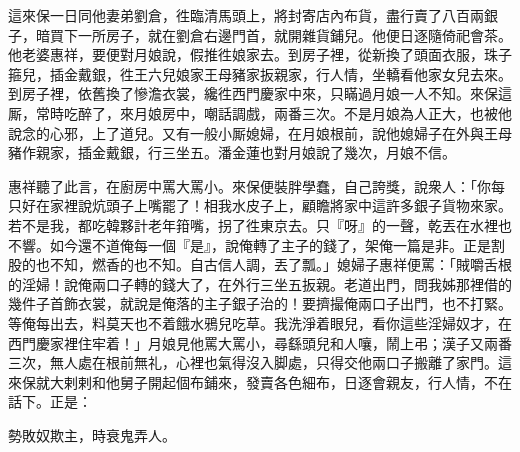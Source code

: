 這來保一日同他妻弟劉倉，徃臨清馬頭上，將封寄店內布貨，盡行賣了八百兩銀子，暗買下一所房子，就在劉倉右邊門首，就開雜貨鋪兒。他便日逐隨倚祀會茶。他老婆惠祥，要便對月娘說，假推徃娘家去。到房子裡，從新換了頭面衣服，珠子箍兒，插金戴銀，徃王六兒娘家王母豬家扳親家，行人情，坐轎看他家女兒去來。到房子裡，依舊換了慘澹衣裳，纔徃西門慶家中來，只瞞過月娘一人不知。來保這厮，常時吃醉了，來月娘房中，嘲話調戲，兩番三次。不是月娘為人正大，也被他說念的心邪，上了道兒。又有一般小厮媳婦，在月娘根前，說他媳婦子在外與王母豬作親家，插金戴銀，行三坐五。潘金蓮也對月娘說了幾次，月娘不信。

惠祥聽了此言，在廚房中罵大罵小。來保便裝胖學蠢，自己誇獎，說衆人：「你每只好在家裡說炕頭子上嘴罷了！相我水皮子上，顧瞻將家中這許多銀子貨物來家。若不是我，都吃韓夥計老年箝嘴，拐了徃東京去。{}只『呀』的一聲，乾丟在水裡也不響。如今還不道俺每一個『是』，說俺轉了主子的錢了，架俺一篇是非。正是割股的也不知，燃香的也不知。自古信人調，丟了瓢。」媳婦子惠祥便罵：「賊嚼舌根的淫婦！說俺兩口子轉的錢大了，在外行三坐五扳親。老道出門，問我姊那裡借的幾件子首飾衣裳，就說是俺落的主子銀子治的！要擠撮俺兩口子出門，也不打緊。{}等俺每出去，料莫天也不着餓水鴉兒吃草。我洗淨着眼兒，看你這些淫婦奴才，在西門慶家裡住牢着！」月娘見他罵大罵小，尋繇頭兒和人嚷，鬧上弔；漢子又兩番三次，無人處在根前無礼，心裡也氣得沒入脚處，只得交他兩口子搬離了家門。這來保就大剌剌和他舅子開起個布鋪來，發賣各色細布，日逐會親友，行人情，不在話下。正是：

勢敗奴欺主，時衰鬼弄人。

